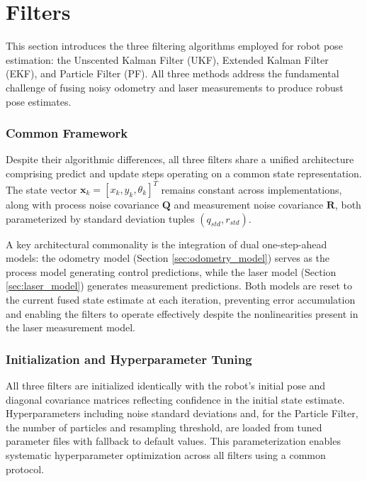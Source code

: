 \documentclass[conference]{IEEEtran}
\begin{document}
\section{Filters} \label{sec:filters}

This section introduces the three filtering algorithms employed for robot pose estimation: the Unscented Kalman Filter (UKF), Extended Kalman Filter (EKF), and Particle Filter (PF). All three methods address the fundamental challenge of fusing noisy odometry and laser measurements to produce robust pose estimates.

\subsubsection{Common Framework}

Despite their algorithmic differences, all three filters share a unified architecture comprising predict and update steps operating on a common state representation. The state vector $\mathbf{x}_k = [x_k, y_k, \theta_k]^T$ remains constant across implementations, along with process noise covariance $\mathbf{Q}$ and measurement noise covariance $\mathbf{R}$, both parameterized by standard deviation tuples $(q_{std}, r_{std})$.

A key architectural commonality is the integration of dual one-step-ahead models: the odometry model (Section \ref{sec:odometry_model}) serves as the process model generating control predictions, while the laser model (Section \ref{sec:laser_model}) generates measurement predictions. Both models are reset to the current fused state estimate at each iteration, preventing error accumulation and enabling the filters to operate effectively despite the nonlinearities present in the laser measurement model.

\subsubsection{Initialization and Hyperparameter Tuning}

All three filters are initialized identically with the robot's initial pose and diagonal covariance matrices reflecting confidence in the initial state estimate. Hyperparameters including noise standard deviations and, for the Particle Filter, the number of particles and resampling threshold, are loaded from tuned parameter files with fallback to default values. This parameterization enables systematic hyperparameter optimization across all filters using a common protocol.
\end{document}
